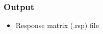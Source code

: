 \documentclass[11pt,oneside,a4paper]{article}
\begin{document}
\subsubsection*{Output}
\begin{itemize}
    \item{Response matrix (.rsp) file}
\end{itemize}



%
\end{document}
